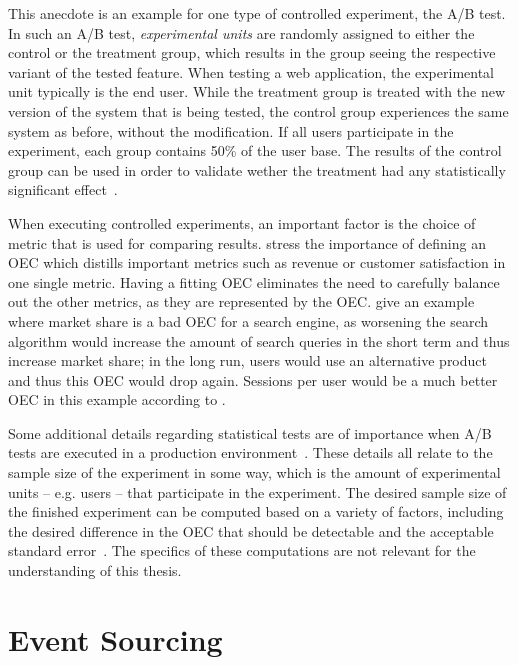 This anecdote is an example for one type of controlled experiment, the A/B test.
In such an A/B test, \emph{experimental units} are randomly assigned to either the control or the treatment group, which results in the group seeing the respective variant of the tested feature.
When testing a web application, the experimental unit typically is the end user.
While the treatment group is treated with the new version of the system that is being tested, the control group experiences the same system as before, without the modification.
If all users participate in the experiment, each group contains 50\% of the user base.
The results of the control group can be used in order to validate wether the treatment had any statistically significant effect~\cite{Kohavi2009}.

When executing controlled experiments, an important factor is the choice of metric that is used for comparing results.
\citet{Kohavi2013a} stress the importance of defining an \ac{OEC} which distills important metrics such as revenue or customer satisfaction in one single metric.
Having a fitting \ac{OEC} eliminates the need to carefully balance out the other metrics, as they are represented by the \ac{OEC}.
\citeauthor{Kohavi2013a} give an example where market share is a bad \ac{OEC} for a search engine, as worsening the search algorithm would increase the amount of search queries in the short term and thus increase market share; in the long run, users would use an alternative product and thus this \ac{OEC} would drop again.
Sessions per user would be a much better \ac{OEC} in this example according to \citeauthor{Kohavi2013a}.

Some additional details regarding statistical tests are of importance when A/B tests are executed in a production environment~\cite{Kohavi2009}.
These details all relate to the sample size of the experiment in some way, which is the amount of experimental units -- e.g. users -- that participate in the experiment.
The desired sample size of the finished experiment can be computed based on a variety of factors, including the desired difference in the \ac{OEC} that should be detectable and the acceptable standard error~\cite{mason2003statistical}.
The specifics of these computations are not relevant for the understanding of this thesis.

\section{Event Sourcing}
\label{sec:fundamentals:event}

